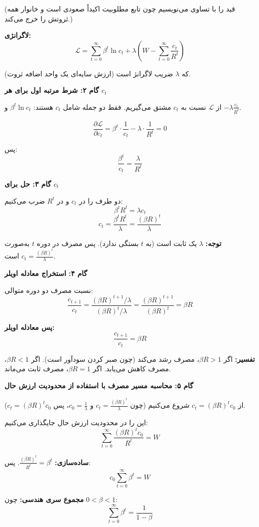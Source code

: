 \documentclass[12pt,a4paper]{article}
\begin{document}
(قید را با تساوی می‌نویسیم چون تابع مطلوبیت اکیداً صعودی است و خانوار همه ثروتش را خرج می‌کند.)

\textbf{لاگرانژی:}
\[
	\mathcal{L} = \sum_{t=0}^{\infty} \beta^t \ln c_t + \lambda \left( W - \sum_{t=0}^{\infty} \frac{c_t}{R^t} \right)
\]

که $\lambda$ ضریب لاگرانژ است (ارزش سایه‌ای یک واحد اضافه ثروت).

\textbf{گام ۲: شرط مرتبه اول برای هر $c_t$}

از $\mathcal{L}$ نسبت به $c_t$ مشتق می‌گیریم. فقط دو جمله شامل $c_t$ هستند: $\beta^t \ln c_t$ و $-\lambda \frac{c_t}{R^t}$.

\[
	\frac{\partial \mathcal{L}}{\partial c_t} = \beta^t \cdot \frac{1}{c_t} - \lambda \cdot \frac{1}{R^t} = 0
\]

پس:
\[
	\frac{\beta^t}{c_t} = \frac{\lambda}{R^t}
\]

\textbf{گام ۳: حل برای $c_t$}

دو طرف را در $c_t$ و در $R^t$ ضرب می‌کنیم:
\[
	\beta^t R^t = \lambda c_t
\]
\[
	c_t = \frac{\beta^t R^t}{\lambda} = \frac{(\beta R)^t}{\lambda}
\]

\textbf{توجه:} $\lambda$ یک ثابت است (به $t$ بستگی ندارد). پس مصرف در دوره $t$ به‌صورت $c_t = \frac{(\beta R)^t}{\lambda}$ است.

\textbf{گام ۴: استخراج معادله اویلر}

نسبت مصرف دو دوره متوالی:
\[
	\frac{c_{t+1}}{c_t} = \frac{(\beta R)^{t+1}/\lambda}{(\beta R)^t/\lambda} = \frac{(\beta R)^{t+1}}{(\beta R)^t} = \beta R
\]

\textbf{پس معادله اویلر:}
\[
	\boxed{\frac{c_{t+1}}{c_t} = \beta R}
\]

\textbf{تفسیر:} اگر $\beta R > 1$، مصرف رشد می‌کند (چون صبر کردن سودآور است). اگر $\beta R < 1$، مصرف کاهش می‌یابد. اگر $\beta R = 1$، مصرف ثابت می‌ماند.

\textbf{گام ۵: محاسبه مسیر مصرف با استفاده از محدودیت ارزش حال}

از $c_t = (\beta R)^t c_0$ شروع می‌کنیم (چون $c_t = \frac{(\beta R)^t}{\lambda}$ و $c_0 = \frac{1}{\lambda}$، پس $c_t = (\beta R)^t c_0$).

این را در محدودیت ارزش حال جایگذاری می‌کنیم:
\[
	\sum_{t=0}^{\infty} \frac{(\beta R)^t c_0}{R^t} = W
\]

\textbf{ساده‌سازی:} $\frac{(\beta R)^t}{R^t} = \beta^t$. پس:
\[
	c_0 \sum_{t=0}^{\infty} \beta^t = W
\]

\textbf{مجموع سری هندسی:} چون $0 < \beta < 1$:
\[
	\sum_{t=0}^{\infty} \beta^t = \frac{1}{1-\beta}
\]
\end{document}
